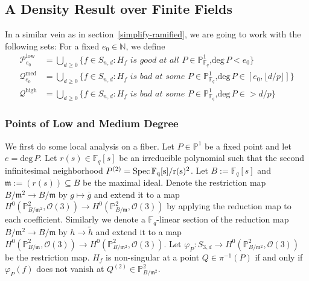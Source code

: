 \documentclass[12pt]{article}
\theoremstyle{plain}
\theoremstyle{definition}
\newcommand{\fm}{\mathfrak{m}}
\newcommand{\IN}{\mathbb{N}}
\newcommand{\IF}{\mathbb{F}}
\newcommand{\IP}{\mathbb{P}}
\newcommand{\sO}{\mathcal{O}}
\newcommand{\sP}{\mathcal{P}}
\newcommand{\sQ}{\mathcal{Q}}
\renewcommand{\deg}{\mathrm{deg}\,}
\newcommand{\Spec}{\rm Spec\,}
\newcommand\union{\bigcup}
\newcommand{\<}{\langle}
\renewcommand{\>}{\rangle}
\def\wt{\widetilde}
\begin{document}
\subsection{A Density Result over Finite Fields}
In a similar vein as in section~\ref{simplify-ramified}, we are going to work with the following sets:
For a fixed $e_0 \in \IN$, we define 
\begin{align*}
\sP_{e_0}^{\mathrm{low}} &= \union_{d \ge 0} \{ f \in S_{n, d} : H_f \textit{ is good at all $P \in \IP^1_{\IF_q}$,}\deg P < e_0\}\\
\sQ_{e_0}^{\mathrm{med}} &= \union_{d \ge 0} \{f \in S_{n, d} : H_f \textit{ is bad at some $P \in \IP^1_{\IF_q}$,}\deg P \in [e_0, \lfloor d/p \rfloor]\}\\
\sQ^{\mathrm{high}} &= \union_{d \ge 0} \{f \in S_{n, d} : H_f \textit{ is bad at some $P \in \IP^1_{\IF_q}$,}\deg P \in > d/p\}
\end{align*}
\subsubsection{Points of Low and Medium Degree}
 

We first do some local analysis on a fiber. Let $P \in \IP^1$ be a fixed point and let $e = \deg P$. Let $r(s) \in \IF_q[s]$ be an irreducible polynomial such that the second infinitesimal neighborhood $P^{(2)} = \Spec \IF_q[s]/r(s)^2$. Let $B := \IF_q[s]$ and $\fm := (r(s)) \subseteq B$ be the maximal ideal. Denote the restriction map $B/\fm^2 \to B/\fm$ by $g \mapsto \overline{g}$ and extend it to a map $H^0(\IP^2_{B/\fm^2}, \sO(3)) \to H^0(\IP^2_{B/\fm}, \sO(3))$ by applying the reduction map to each coefficient. Similarly we denote a $\IF_q$-linear section of the reduction map $B/\fm^2 \to B/\fm$ by $h \to \wt{h}$ and extend it to a map $H^0(\IP^2_{B/\fm}, \sO(3)) \to H^0(\IP^2_{B/\fm^2}, \sO(3))$. Let $\varphi_P : S_{3, d} \to H^0(\IP^2_{B/\fm^2}, \sO(3))$ be the restriction map. $H_f$ is non-singular at a point $Q \in \pi^{-1}(P)$ if and only if $\varphi_P(f)$ does not vanish at $Q^{(2)} \in \IP^2_{B/\fm^2}$. 
\end{document}
